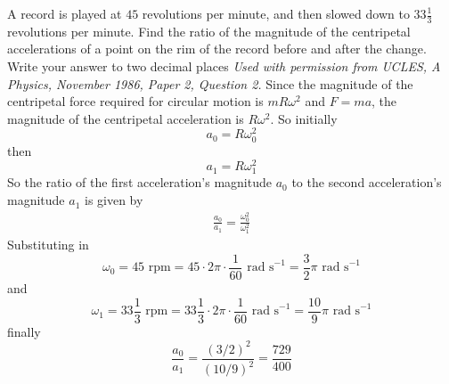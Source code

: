 \begin{problem}
{A record is played at $45$ revolutions per minute, and then slowed down to $33\frac{1}{3}$ revolutions per minute. Find the ratio of the magnitude of the centripetal accelerations of a point on the rim of the record before and after the change. Write your answer to two decimal places} 
{\textit{Used with permission from UCLES, A Physics, November 1986, Paper 2, Question 2.}}
{Since the magnitude of the centripetal force required for circular motion is $mR\omega^2$ and $F=ma$, the magnitude of the centripetal acceleration is $R\omega^2$. So initially
\begin{equation*} a_0=R\omega_0^2 \end{equation*}
then 
\begin{equation*} a_1=R\omega_1^2 \end{equation*}
So the ratio of the first acceleration's magnitude $a_0$ to the second acceleration's magnitude $a_1$ is given by 
\begin{align*} \frac{a_0}{a_1}=\frac{\omega_0^2}{\omega_1^2} \end{align*}
Substituting in 
\begin{equation*}
\omega_0=45\textrm{ rpm}=45\cdot2\pi\cdot\frac{1}{60}\textrm{ rad s}^{-1}=\frac{3}{2}\pi\textrm{ rad s}^{-1}
\end{equation*} and
\begin{equation*}
\omega_1=33\frac{1}{3}\textrm{ rpm}=33\frac{1}{3}\cdot2\pi\cdot\frac{1}{60}\textrm{ rad s}^{-1}=\frac{10}{9}\pi\textrm{ rad s}^{-1}
\end{equation*}
finally
\begin{equation*} \frac{a_0}{a_1}=\frac{(3/2)^2}{(10/9)^2}=\frac{729}{400} \end{equation*}
}
\end{problem}